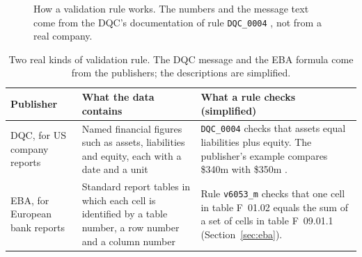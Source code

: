 \documentclass[11pt,a4paper]{article}
\newcommand{\ab}{\allowbreak}
\begin{document}
\begin{figure}[htb]
\centering
{}
\caption{How a validation rule works. The numbers and the message text come from the DQC's documentation of rule \texttt{DQC\_0004} \cite{dqc0004}, not from a real company.}
\label{fig:rule}
\end{figure}

\begin{table}[htb]
\centering
\small
\begin{tabularx}{\textwidth}{P{3.2cm} L L}
\toprule
Publisher & What the data contains & What a rule checks (simplified) \\
\midrule
DQC, for US company reports & Named financial figures such as assets, liabilities and equity, each with a date and a unit & \texttt{DQC\_0004} checks that assets equal liabilities plus equity. The publisher's example compares \$340m with \$350m \cite{dqc0004}. \\
EBA, for European bank reports & Standard report tables in which each cell is identified by a table number, a row number and a column number & Rule \texttt{v6053\_m} checks that one cell in table F~01.02 equals the sum of a set of cells in table F~09.01.1 \cite{ebaqa} (Section~\ref{sec:eba}). \\
\bottomrule
\end{tabularx}
\caption{Two real kinds of validation rule. The DQC message and the EBA formula come from the publishers; the descriptions are simplified.}
\label{tab:twokinds}
\end{table}
\end{document}
